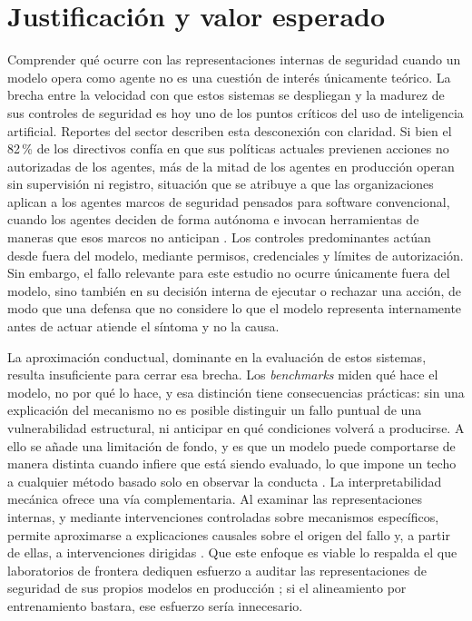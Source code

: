 \section{Justificación y valor esperado}
\label{sec:justificacion}

Comprender qué ocurre con las representaciones internas de seguridad cuando un modelo opera como agente no es una cuestión de interés únicamente teórico. La brecha entre la velocidad con que estos sistemas se despliegan y la madurez de sus controles de seguridad es hoy uno de los puntos críticos del uso de inteligencia artificial. Reportes del sector describen esta desconexión con claridad. Si bien el 82\,\% de los directivos confía en que sus políticas actuales previenen acciones no autorizadas de los agentes, más de la mitad de los agentes en producción operan sin supervisión ni registro, situación que se atribuye a que las organizaciones aplican a los agentes marcos de seguridad pensados para software convencional, cuando los agentes deciden de forma autónoma e invocan herramientas de maneras que esos marcos no anticipan \parencite{gravitee2026}. Los controles predominantes actúan desde fuera del modelo, mediante permisos, credenciales y límites de autorización. Sin embargo, el fallo relevante para este estudio no ocurre únicamente fuera del modelo, sino también en su decisión interna de ejecutar o rechazar una acción, de modo que una defensa que no considere lo que el modelo representa internamente antes de actuar atiende el síntoma y no la causa.

La aproximación conductual, dominante en la evaluación de estos sistemas, resulta insuficiente para cerrar esa brecha. Los \textit{benchmarks} miden qué hace el modelo, no por qué lo hace, y esa distinción tiene consecuencias prácticas: sin una explicación del mecanismo no es posible distinguir un fallo puntual de una vulnerabilidad estructural, ni anticipar en qué condiciones volverá a producirse. A ello se añade una limitación de fondo, y es que un modelo puede comportarse de manera distinta cuando infiere que está siendo evaluado, lo que impone un techo a cualquier método basado solo en observar la conducta \parencite{greenblatt2024}. La interpretabilidad mecánica ofrece una vía complementaria. Al examinar las representaciones internas, y mediante intervenciones controladas sobre mecanismos específicos, permite aproximarse a explicaciones causales sobre el origen del fallo y, a partir de ellas, a intervenciones dirigidas \parencite{arditi2024}. Que este enfoque es viable lo respalda el que laboratorios de frontera dediquen esfuerzo a auditar las representaciones de seguridad de sus propios modelos en producción \parencite{templeton2024}; si el alineamiento por entrenamiento bastara, ese esfuerzo sería innecesario.

